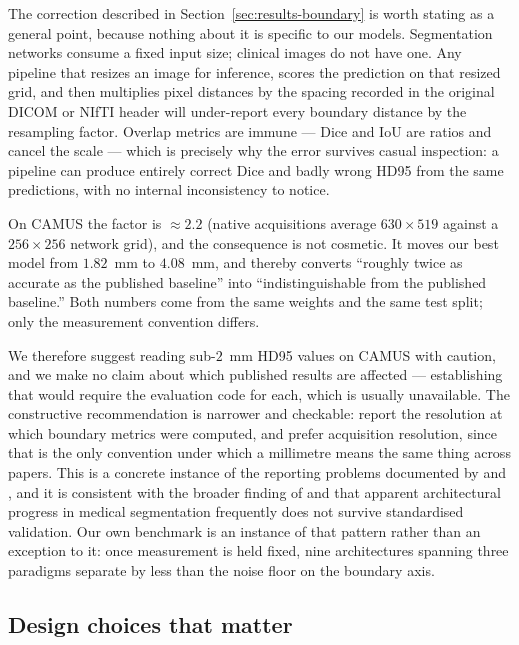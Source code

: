 The correction described in Section~\ref{sec:results-boundary} is worth
stating as a general point, because nothing about it is specific to our
models. Segmentation networks consume a fixed input size; clinical images
do not have one. Any pipeline that resizes an image for inference, scores
the prediction on that resized grid, and then multiplies pixel distances
by the spacing recorded in the original DICOM or NIfTI header will
under-report every boundary distance by the resampling factor. Overlap
metrics are immune --- Dice and IoU are ratios and cancel the scale ---
which is precisely why the error survives casual inspection: a pipeline
can produce entirely correct Dice and badly wrong HD95 from the same
predictions, with no internal inconsistency to notice.

On CAMUS the factor is $\approx 2.2$ (native acquisitions average
$630 \times 519$ against a $256 \times 256$ network grid), and the
consequence is not cosmetic. It moves our best model from $1.82$~mm to
$4.08$~mm, and thereby converts ``roughly twice as accurate as the
published baseline'' into ``indistinguishable from the published
baseline.'' Both numbers come from the same weights and the same test
split; only the measurement convention differs.

We therefore suggest reading sub-$2$~mm HD95 values on CAMUS with
caution, and we make no claim about which published results are affected
--- establishing that would require the evaluation code for each, which is
usually unavailable. The constructive recommendation is narrower and
checkable: report the resolution at which boundary metrics were computed,
and prefer acquisition resolution, since that is the only convention under
which a millimetre means the same thing across papers. This is a concrete
instance of the reporting problems documented by
\citet{reinke2021limitations} and \citet{maierhein2024metrics}, and it is
consistent with the broader finding of \citet{isensee2024revisited} and
\citet{kazaj2025claims} that apparent architectural progress in medical
segmentation frequently does not survive standardised validation. Our own
benchmark is an instance of that pattern rather than an exception to it:
once measurement is held fixed, nine architectures spanning three
paradigms separate by less than the noise floor on the boundary axis.

\subsection{Design choices that matter}
\label{sec:disc-design}

